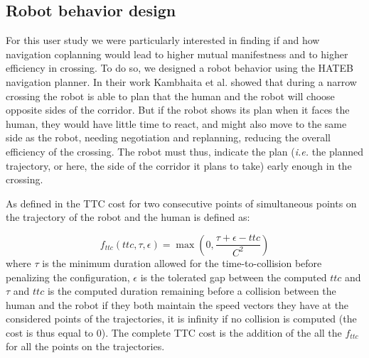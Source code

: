 \documentclass[a4paper,11pt,twoside]{StyleThese}
\begin{document}
\subsection{Robot behavior design}
For this user study we were particularly interested in finding if and how navigation coplanning would lead to higher mutual manifestness and to higher efficiency in crossing.
To do so, we designed a robot behavior using the HATEB navigation planner.
In their work Kambhaita et al. showed that during a narrow crossing the robot is able to plan that the human and the robot will choose opposite sides of the corridor. But if the robot shows its plan when it faces the human, they would have little time to react, and might also move to the same side as the robot, needing negotiation and replanning, reducing the overall efficiency of the crossing. The robot must thus, indicate the plan (\textit{i.e.} the planned trajectory, or here, the side of the corridor it plans to take) early enough in the crossing.

As defined in \cite{khambhaita_viewing_2017} the TTC cost for two consecutive points of simultaneous points on the trajectory of the robot and the human is defined as:

\begin{equation}\label{eq:ttc}
f_{ttc}(ttc, \tau, \epsilon) = \max(0, \frac{\tau + \epsilon - ttc}{C^2})
\end{equation}
where $\tau$ is the minimum duration allowed for the time-to-collision before penalizing the configuration, $\epsilon$ is the tolerated gap between the computed $ttc$ and $\tau$ and $ttc$ is the computed duration remaining before a collision between the human and the robot if they both maintain the speed vectors they have at the considered points of the trajectories, it is infinity if no collision is computed (the cost is thus equal to 0). The complete TTC cost is the addition of the all the $f_{ttc}$ for all the points on the trajectories.
\end{document}
